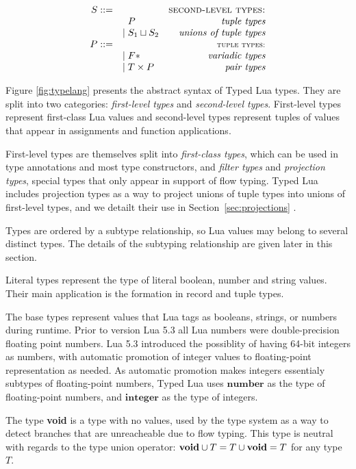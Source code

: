 \documentclass[preprint]{sigplanconf}
\newcommand{\Nil}{\mathbf{nil}}
\newcommand{\Integer}{\mathbf{integer}}
\newcommand{\Number}{\mathbf{number}}
\newcommand{\Void}{\Nil{*}}
\begin{document}
\begin{figure*}[t]
$$\begin{array}{rlr}
S ::= & & \textsc{second-level types:}\\
& \;\; P & \textit{tuple types}\\
& | \; S_{1} \sqcup S_{2} & \textit{unions of tuple types}\\
P ::= & & \textsc{{\small tuple types:}}\\
& | \; F{*} & \textit{variadic types}\\
& | \; T \times P & \textit{pair types}
\end{array}
$$
\caption{Type Language}
\label{fig:typelang}
\end{figure*}

Figure \ref{fig:typelang} presents the abstract syntax of
Typed Lua types. They are split into two categories:
\emph{first-level types} and \emph{second-level types}.
First-level types represent first-class Lua values and
second-level types represent tuples of values that appear in 
assignments and function applications. 

First-level types are
themselves split into {\em first-class types}, which can be
used in type annotations and most type constructors, and
{\em filter types} and {\em projection types}, special
types that only appear in support of flow typing.
Typed Lua includes projection types as a way to project
unions of tuple types into unions of first-level types,
and we detailt their use in Section~\ref{sec:projections} .

Types are ordered by a subtype relationship, so Lua values may belong to several distinct types. The details of the subtyping
relationship are given later in this section.

Literal types represent the type of literal boolean, number
and string values. Their main application is the formation in record and tuple types.

The base types represent values that Lua tags as booleans,
strings, or numbers during runtime. Prior to version Lua 5.3 all Lua numbers were double-precision floating point numbers.
Lua 5.3 introduced the possiblity of having 64-bit integers
as numbers, with automatic promotion of integer values to
floating-point representation as needed. As automatic
promotion makes integers essentialy subtypes of floating-point numbers, Typed Lua uses $\Number$ as the type of floating-point numbers, and $\Integer$ as the type of integers.

The type {\bf void} is a type with no values, used by the
type system as a way to detect branches that are unreacheable
due to flow typing. This type is neutral with regards to
the type union operator: ${\bf void} \cup T = T \cup {\bf void} = T$ for any type $T$.
\end{document}
